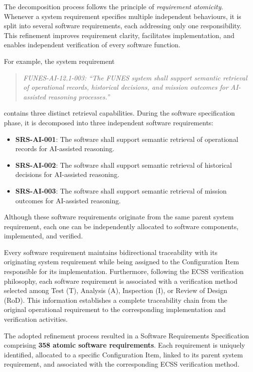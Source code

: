 The decomposition process follows the principle of \emph{requirement atomicity}. Whenever a system requirement specifies multiple independent behaviours, it is split into several software requirements, each addressing only one responsibility. This refinement improves requirement clarity, facilitates implementation, and enables independent verification of every software function.

For example, the system requirement

\begin{quote}
\textit{FUNES-AI-12.1-003: ``The FUNES system shall support semantic retrieval of operational records, historical decisions, and mission outcomes for AI-assisted reasoning processes.''}
\end{quote}

contains three distinct retrieval capabilities. During the software specification phase, it is decomposed into three independent software requirements:

\begin{itemize}
    \item \textbf{SRS-AI-001}: The software shall support semantic retrieval of operational records for AI-assisted reasoning.
    \item \textbf{SRS-AI-002}: The software shall support semantic retrieval of historical decisions for AI-assisted reasoning.
    \item \textbf{SRS-AI-003}: The software shall support semantic retrieval of mission outcomes for AI-assisted reasoning.
\end{itemize}

Although these software requirements originate from the same parent system requirement, each one can be independently allocated to software components, implemented, and verified.

Every software requirement maintains bidirectional traceability with its originating system requirement while being assigned to the Configuration Item responsible for its implementation. Furthermore, following the ECSS verification philosophy, each software requirement is associated with a verification method selected among Test (T), Analysis (A), Inspection (I), or Review of Design (RoD). This information establishes a complete traceability chain from the original operational requirement to the corresponding implementation and verification activities.

The adopted refinement process resulted in a Software Requirements Specification comprising \textbf{358 atomic software requirements}. Each requirement is uniquely identified, allocated to a specific Configuration Item, linked to its parent system requirement, and associated with the corresponding ECSS verification method.

